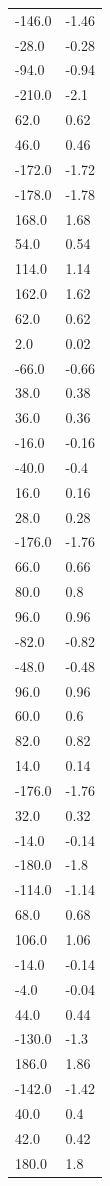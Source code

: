 \begin{longtable}{ll}
-146.0 & -1.46 \\
-28.0 & -0.28 \\
-94.0 & -0.94 \\
-210.0 & -2.1 \\
62.0 & 0.62 \\
46.0 & 0.46 \\
-172.0 & -1.72 \\
-178.0 & -1.78 \\
168.0 & 1.68 \\
54.0 & 0.54 \\
114.0 & 1.14 \\
162.0 & 1.62 \\
62.0 & 0.62 \\
2.0 & 0.02 \\
-66.0 & -0.66 \\
38.0 & 0.38 \\
36.0 & 0.36 \\
-16.0 & -0.16 \\
-40.0 & -0.4 \\
16.0 & 0.16 \\
28.0 & 0.28 \\
-176.0 & -1.76 \\
66.0 & 0.66 \\
80.0 & 0.8 \\
96.0 & 0.96 \\
-82.0 & -0.82 \\
-48.0 & -0.48 \\
96.0 & 0.96 \\
60.0 & 0.6 \\
82.0 & 0.82 \\
14.0 & 0.14 \\
-176.0 & -1.76 \\
32.0 & 0.32 \\
-14.0 & -0.14 \\
-180.0 & -1.8 \\
-114.0 & -1.14 \\
68.0 & 0.68 \\
106.0 & 1.06 \\
-14.0 & -0.14 \\
-4.0 & -0.04 \\
44.0 & 0.44 \\
-130.0 & -1.3 \\
186.0 & 1.86 \\
-142.0 & -1.42 \\
40.0 & 0.4 \\
42.0 & 0.42 \\
180.0 & 1.8 \\

\end{longtable}
